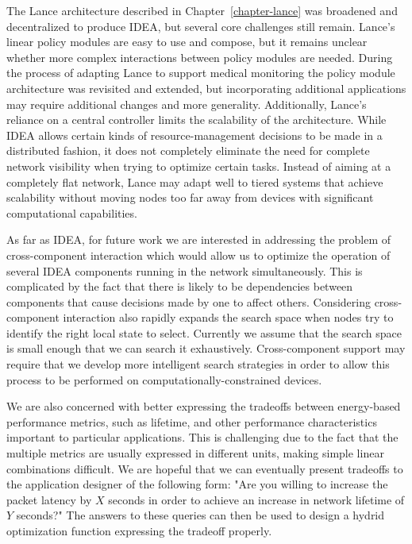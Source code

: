 The Lance architecture described in Chapter~\ref{chapter-lance} was broadened
and decentralized to produce IDEA, but several core challenges still remain.
Lance's linear policy modules are easy to use and compose, but it remains
unclear whether more complex interactions between policy modules are needed.
During the process of adapting Lance to support medical monitoring the policy
module architecture was revisited and extended, but incorporating additional
applications may require additional changes and more generality.
Additionally, Lance's reliance on a central controller limits the scalability
of the architecture. While IDEA allows certain kinds of resource-management
decisions to be made in a distributed fashion, it does not completely
eliminate the need for complete network visibility when trying to optimize
certain tasks. Instead of aiming at a completely flat network, Lance may
adapt well to tiered systems that achieve scalability without moving nodes
too far away from devices with significant computational capabilities.

As far as IDEA, for future work we are interested in addressing the problem
of cross-component interaction which would allow us to optimize the operation
of several IDEA components running in the network simultaneously. This is
complicated by the fact that there is likely to be dependencies between
components that cause decisions made by one to affect others. Considering
cross-component interaction also rapidly expands the search space when nodes
try to identify the right local state to select. Currently we assume that the
search space is small enough that we can search it exhaustively.
Cross-component support may require that we develop more intelligent search
strategies in order to allow this process to be performed on
computationally-constrained devices.

We are also concerned with better expressing the tradeoffs between
energy-based performance metrics, such as lifetime, and other performance
characteristics important to particular applications. This is challenging due
to the fact that the multiple metrics are usually expressed in different
units, making simple linear combinations difficult. We are hopeful that we
can eventually present tradeoffs to the application designer of the following
form: "Are you willing to increase the packet latency by $X$ seconds in order
to achieve an increase in network lifetime of $Y$ seconds?" The answers to
these queries can then be used to design a hydrid optimization function
expressing the tradeoff properly.

